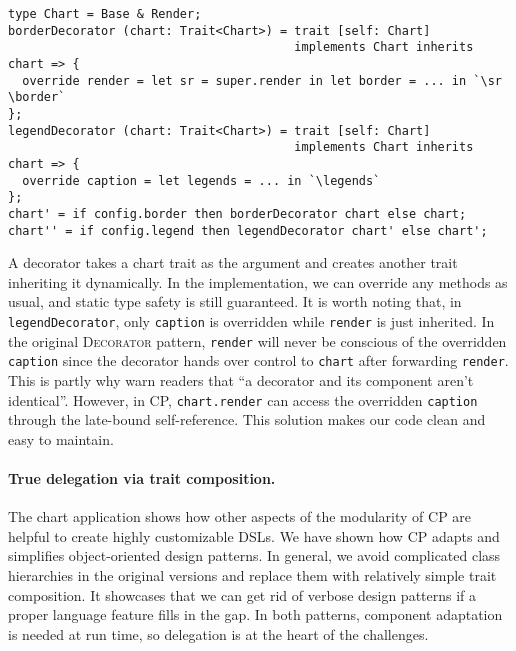 \begin{lstlisting}
type Chart = Base & Render;
borderDecorator (chart: Trait<Chart>) = trait [self: Chart]
                                        implements Chart inherits chart => {
  override render = let sr = super.render in let border = ... in `\sr \border`
};
legendDecorator (chart: Trait<Chart>) = trait [self: Chart]
                                        implements Chart inherits chart => {
  override caption = let legends = ... in `\legends`
};
chart' = if config.border then borderDecorator chart else chart;
chart'' = if config.legend then legendDecorator chart' else chart';
\end{lstlisting}

\noindent
A decorator takes a chart trait as the argument and creates another trait
inheriting it dynamically. In the implementation, we can override any methods as
usual, and static type safety is still guaranteed. It is worth noting that, in
\lstinline{legendDecorator}, only \lstinline{caption} is overridden while
\lstinline{render} is just inherited. In the original \textsc{Decorator}
pattern, \lstinline{render} will never be conscious of the overridden
\lstinline{caption} since the decorator hands over control to \lstinline{chart}
after forwarding \lstinline{render}. This is partly why \citet{gamma1995design}
warn readers that ``a decorator and its component aren't identical''. However,
in CP, \lstinline{chart.render} can access the overridden \lstinline{caption}
through the late-bound self-reference. This solution makes our code clean and
easy to maintain.

\paragraph{True delegation via trait composition.}
The chart application shows how other aspects of the modularity of CP are
helpful to create highly customizable DSLs. We have shown how CP adapts and
simplifies object-oriented design patterns. In general, we avoid complicated
class hierarchies in the original versions and replace them with relatively
simple trait composition. It showcases that we can get rid of verbose design
patterns if a proper language feature fills in the gap. In both patterns,
component adaptation is needed at run time, so delegation is at the heart of the
challenges.
